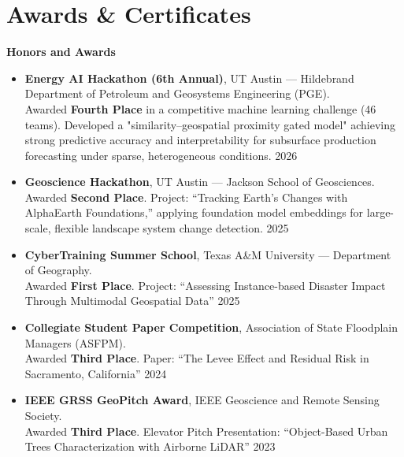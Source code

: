 \documentclass[a4paper,12pt]{article}
\begin{document}
\section{Awards \& Certificates}

\textbf{Honors and Awards}
\begin{itemize}[leftmargin=1.5em, itemsep=4pt, label=--]

    \item \textbf{Energy AI Hackathon (6th Annual)}, UT Austin — Hildebrand Department of Petroleum and Geosystems Engineering (PGE). \\
    Awarded \textbf{Fourth Place} in a competitive machine learning challenge (46 teams). 
    Developed a "similarity–geospatial proximity gated model" achieving strong predictive accuracy and interpretability for subsurface production forecasting under sparse, heterogeneous conditions. \hfill 2026

    \item \textbf{Geoscience Hackathon}, UT Austin — Jackson School of Geosciences. \\
    Awarded \textbf{Second Place}. Project: ``Tracking Earth's Changes with AlphaEarth Foundations,'' applying foundation model embeddings for large-scale, flexible landscape system change detection. \hfill 2025

    \item \textbf{CyberTraining Summer School}, Texas A\&M University — Department of Geography. \\
    Awarded \textbf{First Place}. Project: ``Assessing Instance-based Disaster Impact Through Multimodal Geospatial Data''  \hfill 2025

    \item \textbf{Collegiate Student Paper Competition}, Association of State Floodplain Managers (ASFPM). \\
    Awarded \textbf{Third Place}. Paper: ``The Levee Effect and Residual Risk in Sacramento, California'' \hfill 2024

    \item \textbf{IEEE GRSS GeoPitch Award}, IEEE Geoscience and Remote Sensing Society. \\
    Awarded \textbf{Third Place}. Elevator Pitch Presentation: ``Object-Based Urban Trees Characterization with Airborne LiDAR'' \hfill 2023

\end{itemize}
\end{document}

